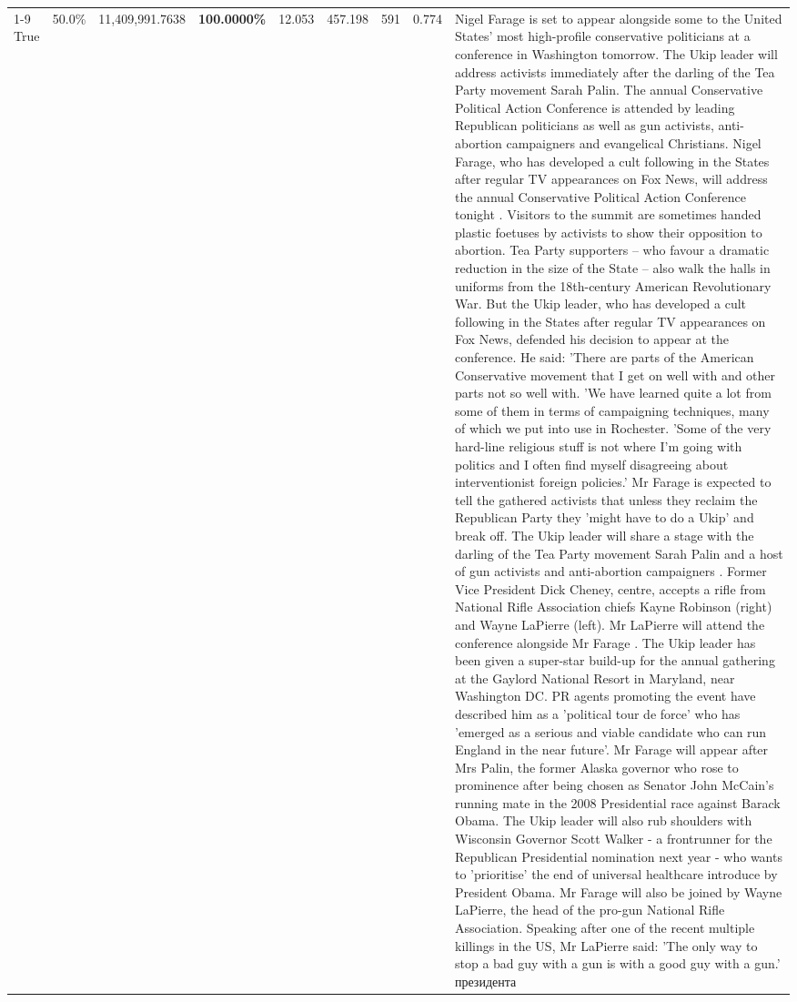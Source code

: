 \begin{table}[H]
\begin{tabular}{lllrlllll}
\cline{1-9}
True & 50.0\% & 11,409,991.7638 & \bfseries \color{red} 100.0000\% & 12.053 & 457.198 & 591 & 0.774 & Nigel Farage is set to appear alongside some to the United States' most high-profile conservative politicians at a conference in Washington tomorrow. The Ukip leader will address activists immediately after the darling of the Tea Party movement Sarah Palin. The annual Conservative Political Action Conference is attended by leading Republican politicians as well as gun activists, anti-abortion campaigners and evangelical Christians. Nigel Farage, who has developed a cult following in the States after regular TV appearances on Fox News, will address the annual Conservative Political Action Conference tonight . Visitors to the summit are sometimes handed plastic foetuses by activists to show their opposition to abortion. Tea Party supporters – who favour a dramatic reduction in the size of the State – also walk the halls in uniforms from the 18th-century American Revolutionary War. But the Ukip leader, who has developed a cult following in the States after regular TV appearances on Fox News, defended his decision to appear at the conference. He said: 'There are parts of the American Conservative movement that I get on well with and other parts not so well with. 'We have learned quite a lot from some of them in terms of campaigning techniques, many of which we put into use in Rochester. 'Some of the very hard-line religious stuff is not where I'm going with politics and I often find myself disagreeing about interventionist foreign policies.' Mr Farage is expected to tell the gathered activists that unless they reclaim the Republican Party they 'might have to do a Ukip' and break off. The Ukip leader will share a stage with the darling of the Tea Party movement Sarah Palin and a host of gun activists and anti-abortion campaigners . Former Vice President Dick Cheney, centre, accepts a rifle from National Rifle Association chiefs Kayne Robinson (right) and Wayne LaPierre (left). Mr LaPierre will attend the conference alongside Mr Farage . The Ukip leader has been given a super-star build-up for the annual gathering at the Gaylord National Resort in Maryland, near Washington DC. PR agents promoting the event have described him as a 'political tour de force' who has 'emerged as a serious and viable candidate who can run England in the near future'. Mr Farage will appear after Mrs Palin, the former Alaska governor who rose to prominence after being chosen as Senator John McCain's running mate in the 2008 Presidential race against Barack Obama. The Ukip leader will also rub shoulders with Wisconsin Governor Scott Walker - a frontrunner for the Republican Presidential nomination next year - who wants to 'prioritise' the end of universal healthcare introduce by President Obama. Mr Farage will also be joined by Wayne LaPierre, the head of the pro-gun National Rifle Association. Speaking after one of the recent multiple killings in the US, Mr LaPierre said: 'The only way to stop a bad guy with a gun is with a good guy with a gun.' президента \\

\end{tabular}
\end{table}

